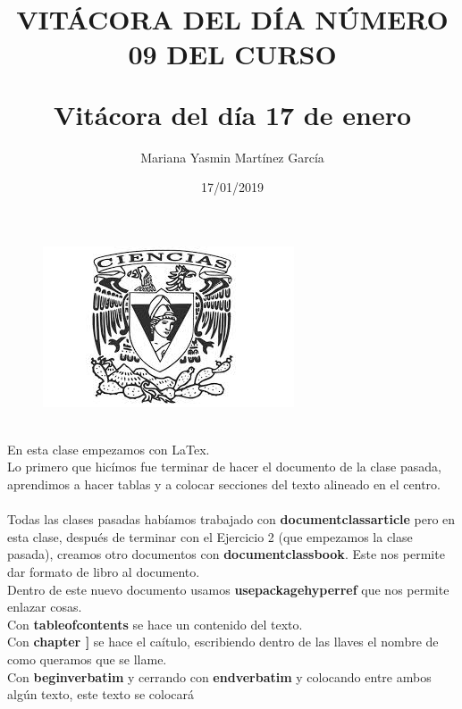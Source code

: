 \documentclass{article}
\title{\Huge\item\color{blue}\textbf{VITÁCORA DEL DÍA NÚMERO 09 DEL CURSO}}
\author{\Large Mariana Yasmin Martínez García}
\date{\Large 17/01/2019}
\begin{document}
\begin{figure}[t]
	\centering
	\includegraphics[width=0.7\linewidth]{Imagenes/1}
	\caption{}
	\label{fig:1}
\end{figure}

	\maketitle
		
	\newpage
	
	\title{\huge\textbf{Vitácora del día 17 de enero\\}} \\
	En esta clase empezamos con LaTex.\\
	Lo primero que hicímos fue terminar de hacer el documento de la clase pasada, aprendimos a hacer tablas y a colocar secciones del texto alineado en el centro.\\ \\
	Todas las clases pasadas habíamos trabajado con \textbf{documentclass{article}} pero en esta clase, después de terminar con el Ejercicio 2 (que empezamos la clase pasada), creamos otro documentos con \textbf{documentclass{book}}. Este nos permite dar formato de libro al documento.\\
	Dentro de este nuevo documento usamos \textbf{usepackage{hyperref}} que nos permite enlazar cosas.\\
	Con \textbf{tableofcontents} se hace un contenido del texto. \\
	Con \textbf{chapter{ }]} se hace el caítulo, escribiendo dentro de las llaves el nombre de como queramos que se llame.\\
	Con \textbf{begin{verbatim}} y cerrando con \textbf{end{verbatim}} y colocando entre ambos algún texto, este texto se colocará
\end{document}
